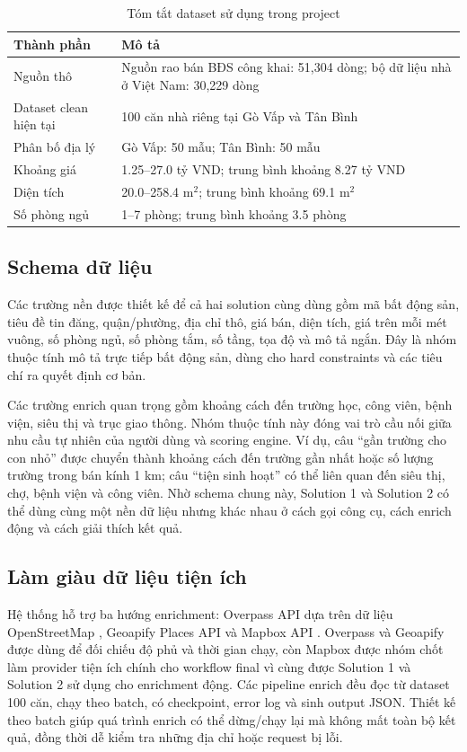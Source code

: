 \documentclass[a4paper,12pt]{article}
\begin{document}
\begin{table}[H]
\centering
\caption{Tóm tắt dataset sử dụng trong project}
\label{tab:dataset_summary}
\small
\begin{tabularx}{\textwidth}{|P{3.8cm}|Y|}
\hline
\textbf{Thành phần} & \textbf{Mô tả} \\ \hline
Nguồn thô & Nguồn rao bán BĐS công khai: 51,304 dòng; bộ dữ liệu nhà ở Việt Nam: 30,229 dòng \\ \hline
Dataset clean hiện tại & 100 căn nhà riêng tại Gò Vấp và Tân Bình \\ \hline
Phân bố địa lý & Gò Vấp: 50 mẫu; Tân Bình: 50 mẫu \\ \hline
Khoảng giá & 1.25--27.0 tỷ VND; trung bình khoảng 8.27 tỷ VND \\ \hline
Diện tích & 20.0--258.4 m$^2$; trung bình khoảng 69.1 m$^2$ \\ \hline
Số phòng ngủ & 1--7 phòng; trung bình khoảng 3.5 phòng \\ \hline
\end{tabularx}
\end{table}

\subsection{Schema dữ liệu}
Các trường nền được thiết kế để cả hai solution cùng dùng gồm mã bất động sản, tiêu đề tin đăng, quận/phường, địa chỉ thô, giá bán, diện tích, giá trên mỗi mét vuông, số phòng ngủ, số phòng tắm, số tầng, tọa độ và mô tả ngắn. Đây là nhóm thuộc tính mô tả trực tiếp bất động sản, dùng cho hard constraints và các tiêu chí ra quyết định cơ bản.

Các trường enrich quan trọng gồm khoảng cách đến trường học, công viên, bệnh viện, siêu thị và trục giao thông. Nhóm thuộc tính này đóng vai trò cầu nối giữa nhu cầu tự nhiên của người dùng và scoring engine. Ví dụ, câu ``gần trường cho con nhỏ'' được chuyển thành khoảng cách đến trường gần nhất hoặc số lượng trường trong bán kính 1 km; câu ``tiện sinh hoạt'' có thể liên quan đến siêu thị, chợ, bệnh viện và công viên. Nhờ schema chung này, Solution 1 và Solution 2 có thể dùng cùng một nền dữ liệu nhưng khác nhau ở cách gọi công cụ, cách enrich động và cách giải thích kết quả.

\subsection{Làm giàu dữ liệu tiện ích}
Hệ thống hỗ trợ ba hướng enrichment: Overpass API dựa trên dữ liệu OpenStreetMap \cite{openstreetmap2026,overpass2026}, Geoapify Places API \cite{geoapify2026} và Mapbox API \cite{mapbox2026}. Overpass và Geoapify được dùng để đối chiếu độ phủ và thời gian chạy, còn Mapbox được nhóm chốt làm provider tiện ích chính cho workflow final vì cùng được Solution 1 và Solution 2 sử dụng cho enrichment động. Các pipeline enrich đều đọc từ dataset 100 căn, chạy theo batch, có checkpoint, error log và sinh output JSON. Thiết kế theo batch giúp quá trình enrich có thể dừng/chạy lại mà không mất toàn bộ kết quả, đồng thời dễ kiểm tra những địa chỉ hoặc request bị lỗi.
\end{document}
